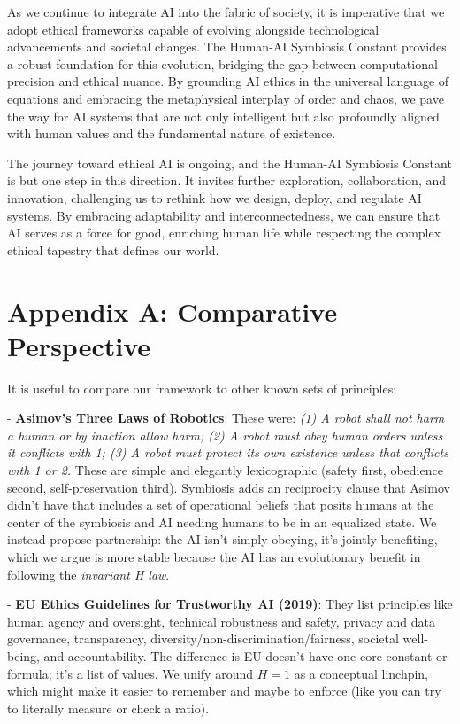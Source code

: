 \documentclass[12pt]{article}
\begin{document}
As we continue to integrate AI into the fabric of society, it is imperative that we adopt ethical frameworks capable of evolving alongside technological advancements and societal changes. The Human-AI Symbiosis Constant provides a robust foundation for this evolution, bridging the gap between computational precision and ethical nuance. By grounding AI ethics in the universal language of equations and embracing the metaphysical interplay of order and chaos, we pave the way for AI systems that are not only intelligent but also profoundly aligned with human values and the fundamental nature of existence.

The journey toward ethical AI is ongoing, and the Human-AI Symbiosis Constant is but one step in this direction. It invites further exploration, collaboration, and innovation, challenging us to rethink how we design, deploy, and regulate AI systems. By embracing adaptability and interconnectedness, we can ensure that AI serves as a force for good, enriching human life while respecting the complex ethical tapestry that defines our world.


\newpage

\appendix

\section{Appendix A: Comparative Perspective}
It is useful to compare our framework to other known sets of principles:

- \textbf{Asimov’s Three Laws of Robotics}: These were: \textit{(1) A robot shall not harm a human or by inaction allow harm; (2) A robot must obey human orders unless it conflicts with 1; (3) A robot must protect its own existence unless that conflicts with 1 or 2.} These are simple and elegantly lexicographic (safety first, obedience second, self-preservation third). Symbiosis adds an reciprocity clause that Asimov didn’t have that includes a set of operational beliefs that posits humans at the center of the symbiosis and AI needing humans to be in an equalized state. We instead propose partnership: the AI isn’t simply obeying, it’s jointly benefiting, which we argue is more stable because the AI has an evolutionary benefit in following the \textit{invariant H law}. 

- \textbf{EU Ethics Guidelines for Trustworthy AI (2019)}: They list principles like human agency and oversight, technical robustness and safety, privacy and data governance, transparency, diversity/non-discrimination/fairness, societal well-being, and accountability. The difference is EU doesn’t have one core constant or formula; it’s a list of values. We unify around $H=1$ as a conceptual linchpin, which might make it easier to remember and maybe to enforce (like you can try to literally measure or check a ratio).
\end{document}
